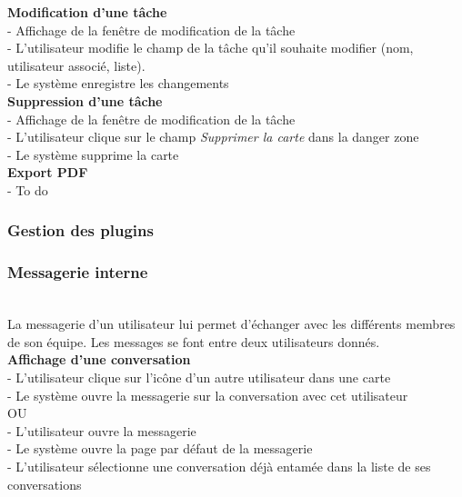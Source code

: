 \documentclass[conference]{IEEEtran}
\begin{document}
\textbf{Modification d'une tâche}\\
- Affichage de la fenêtre de modification de la tâche\\
- L'utilisateur modifie le champ de la tâche qu'il souhaite modifier (nom, utilisateur associé, liste).\\
- Le système enregistre les changements\\

\textbf{Suppression d'une tâche}\\
- Affichage de la fenêtre de modification de la tâche\\
- L'utilisateur clique sur le champ \textit{Supprimer la carte} dans la danger zone\\
- Le système supprime la carte\\

\textbf{Export PDF}\\
- To do\\

\subsubsection{Gestion des plugins}

\subsubsection{Messagerie interne}\hfill\\

La messagerie d'un utilisateur lui permet d'échanger avec les différents membres de son équipe. Les messages se font entre deux utilisateurs donnés.\\

\textbf{Affichage d'une conversation}\\
- L'utilisateur clique sur l'icône d'un autre utilisateur dans une carte\\
- Le système ouvre la messagerie sur la conversation avec cet utilisateur\\
OU\\
- L'utilisateur ouvre la messagerie\\
- Le système ouvre la page par défaut de la messagerie\\
- L'utilisateur sélectionne une conversation déjà entamée dans la liste de ses conversations\\
\end{document}
